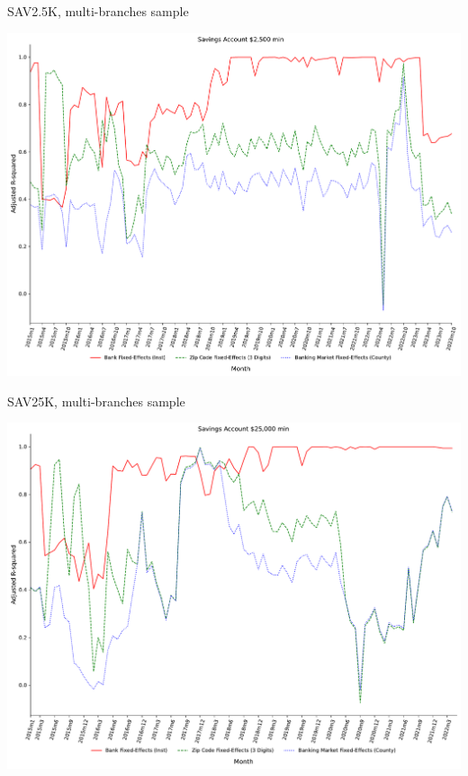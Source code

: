 \documentclass{beamer}
\begin{document}
\begin{frame}{SAV2.5K, multi-branches sample}
\begin{center}
\includegraphics[width=1\textwidth]{figure/multi_branch_sample_932466/3_fixed_effects_same_as_GP_wp/SAV2_5K_adjusted_R2_Rate_3_fixed_effects.pdf} 
\end{center}
\end{frame}



\begin{frame}{SAV25K, multi-branches sample}
\begin{center}
\includegraphics[width=1\textwidth]{figure/multi_branch_sample_932466/3_fixed_effects_same_as_GP_wp/SAV25K_adjusted_R2_Rate_3_fixed_effects.pdf} 
\end{center}
\end{frame}
\end{document}

